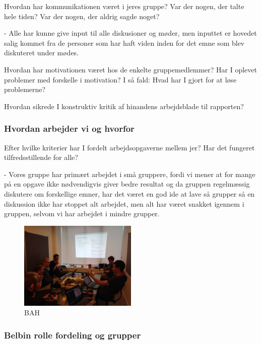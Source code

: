 \documentclass[a4paper,12pt,twoside,openright]{memoir}
\begin{document}
            Hvordan har kommunikationen været i jeres gruppe? Var der nogen, der talte hele tiden? Var der nogen, der aldrig sagde noget?

            - Alle har kunne give input til alle diskusioner og møder, men inputtet er hovedet salig kommet fra de personer som har haft viden inden for det  emne som blev diskuteret under mødes.

Hvordan har motivationen været hos de enkelte gruppemedlemmer? Har I oplevet problemer med forskelle i motivation? I så fald: Hvad har I gjort for at løse problemerne? 
            
Hvordan sikrede I konstruktiv kritik af hinandens arbejdsblade til rapporten? 

            \subsubsection{Hvordan arbejder vi og hvorfor} 
            Efter hvilke kriterier har I fordelt arbejdsopgaverne mellem jer? Har det fungeret tilfredsstillende for alle?

            - Vores gruppe har primært arbejdet i små gruppere, fordi vi mener at for mange på en opgave ikke nødvendigvis giver bedre resultat og da gruppen regelmæssig diskutere om forskellige emner, har det været en god ide at lave så grupper så en diskussion ikke har stoppet alt arbejdet, men alt har været snakket igennem i gruppen, selvom vi har arbejdet i mindre grupper. 

            \begin{figure}[ht!]
                \centering
                \includegraphics[width=0.5\textwidth]{Images/8.jpg}
                \caption{BAH}
                \label{4}
            \end{figure}

            \subsubsection{Belbin rolle fordeling og grupper}
\end{document}
